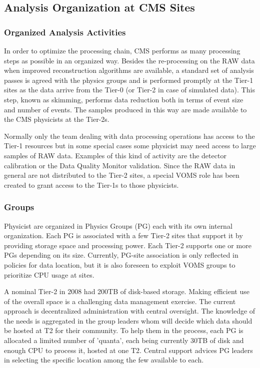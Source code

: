 \subsection{Analysis Organization at CMS Sites}
\label{sec:4_3}
\subsubsection{ Organized Analysis Activities }
\label{sec:4_3_1}
In order to optimize the processing chain, CMS performs as many processing steps as possible in an organized way. 
Besides the re-processing %
on the RAW data when improved reconstruction algorithms are available, a standard set of analysis passes is agreed with the physics groups and is performed promptly at the Tier-1 sites 
as the data arrive from the Tier-0 (or Tier-2 in case of simulated data). 
This step, known as skimming, performs data reduction both in terms of event size and number of events. 
The samples produced in this way are made available to the CMS physicists at the Tier-2s. %

Normally only the team dealing with data processing operations %
has access to the Tier-1 resources but in some special cases 
some physicist may need access to large samples of RAW data. Examples of this kind of activity are the detector 
calibration or the Data Quality Monitor validation. Since the RAW data in general are not distributed to the Tier-2 sites, a special VOMS role has been created to grant access to the Tier-1s to those physicists. 

\subsubsection{Groups}
\label{sec:4_3_2}
Physicist are organized in Physics Groups (PG) each with its own internal organization.
Each PG is associated with a few Tier-2 sites that support it by providing
storage space and processing power.
Each Tier-2 supports one or more PGs depending on its size.
Currently, PG-site association is only reflected in policies for data location,
but it is also foreseen to exploit VOMS groups to prioritize CPU usage at sites.

A nominal Tier-2 in 2008 had 200TB of disk-based storage.
Making efficient use of the overall space is a challenging data management exercise.
The current approach is decentralized administration with central oversight.
The knowledge of the needs is aggregated in the group leaders  whom will decide
which data should be hosted at T2 for their community. To help
them in the process, each PG is allocated a limited number of 'quanta',
each being currently 30TB of disk and enough CPU to process it, hosted
at one T2. Central support advices PG leaders in selecting the specific
location among the few available to each.

